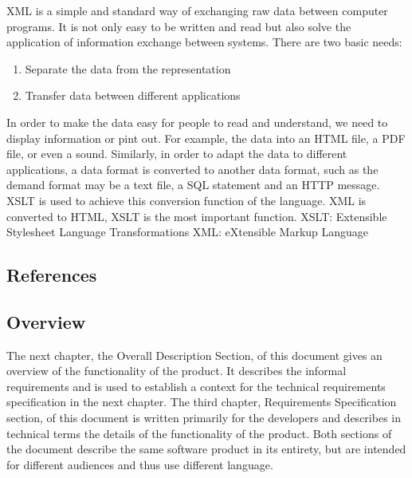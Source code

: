 XML is a simple and standard way of exchanging raw data between computer programs.
It is not only easy to be written and read but also solve the application of information exchange between systems.
There are two basic needs:

\begin{enumerate}
  \item Separate the data from the representation
  \item Transfer data between different applications
\end{enumerate}

In order to make the data easy for people to read and understand, we need to display information or pint out.
For example, the data into an HTML file, a PDF file, or even a sound.
Similarly, in order to adapt the data to different applications, a data format is converted to another data format, such as the demand format may be a text file, a SQL statement and an HTTP message.
XSLT is used to achieve this conversion function of the language.
XML is converted to HTML, XSLT is the most important function.
XSLT: Extensible Stylesheet Language Transformations
XML: eXtensible Markup Language

\subsection{References}


\cite{xalan}
\cite{xerces}
\cite{icu}




\subsection{Overview}

The next chapter, the Overall Description Section, of this document gives an overview of the
functionality of the product.
It describes the informal requirements and is used to establish a context for the technical requirements specification in the next chapter.
The third chapter, Requirements Specification section, of this document is written primarily for the developers and describes in technical terms the details of the functionality of the product.
Both sections of the document describe the same software product in its entirety, but are intended for different audiences and thus use different language.
